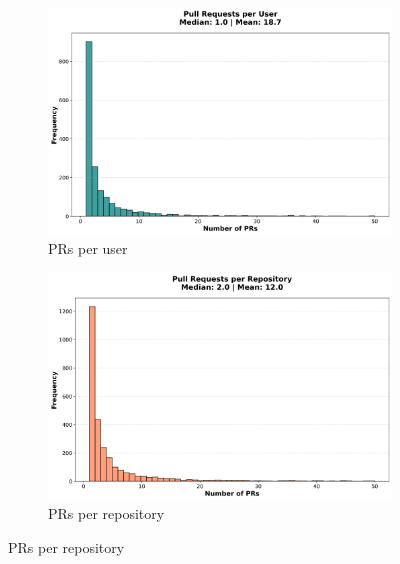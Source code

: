 \documentclass[11pt]{article}
\begin{document}
\begin{figure}[H]
\centering
\begin{subfigure}[b]{0.48\textwidth}
\centering
\includegraphics[width=\textwidth]{figures_individual/19_prs_per_user_histogram.png}
\caption{PRs per user}
\label{fig:prs_user}
\end{subfigure}
\hfill
\begin{subfigure}[b]{0.48\textwidth}
\centering
\includegraphics[width=\textwidth]{figures_individual/20_prs_per_repo_histogram.png}
\caption{PRs per repository}
\label{fig:prs_repo}
\end{subfigure}

\vspace{0.3cm}


\end{figure}
\end{document}
